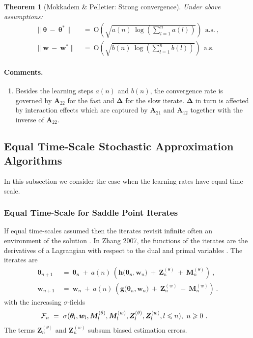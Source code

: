 \documentclass{article}
\newtheorem{theorem}{Theorem}
\newcommand\Bg{\bm{g}}
\newcommand\Bh{\bm{h}}
\newcommand\Bw{\bm{w}}
\newcommand\BA{\bm{A}}
\newcommand\BM{\bm{M}}
\newcommand\BZ{\bm{Z}}
\newcommand\Bth{\bm{\theta}}
\newcommand\BDe{\bm{\Delta}}
\newcommand{\rO}{\mathrm{O}} \newcommand{\rP}{\mathrm{P}}
\renewcommand{\leq}{\leqslant}
\renewcommand{\geq}{\geqslant}
\begin{document}
\begin{theorem}[Mokkadem \& Pelletier: Strong convergence]
\label{th:Mokkadem1}
Under above assumptions:
\begin{align}
\| \Bth \ - \ \Bth^{*} \| \ &= \
\rO \left(
\sqrt{a(n) \ \log \left( \sum_{l=1}^{n} a(l) \right) }
\right) \ \  \text{a.s.}  \ , \\
\| \Bw \ - \ \Bw^{*} \| \ &= \
\rO \left(
\sqrt{b(n) \ \log \left( \sum_{l=1}^{n} b(l) \right) }
\right) \ \  \text{a.s.}
\end{align}
\end{theorem}

\paragraph{Comments.}
\begin{enumerate}[label=\textbf{(C\arabic*)}]
\item
Besides the learning steps $a(n)$ and $b(n)$,
the convergence rate is governed by
$\BA_{22}$ for the fast and $\BDe$
for the slow iterate.
$\BDe$ in turn is affected by interaction effects which are
captured by $\BA_{21}$ and $\BA_{12}$ together with the inverse of
$\BA_{22}$.

\end{enumerate}

\subsection{Equal Time-Scale Stochastic Approximation Algorithms}
\label{sec:equalTime}


In this subsection we consider the case when the learning rates have
equal time-scale.


\subsubsection{Equal Time-Scale for Saddle Point Iterates}

If equal time-scales assumed then the iterates revisit infinite often
an environment of the solution \cite{Zhang:07}.
In Zhang 2007, the functions of the
iterates are the derivatives of a Lagrangian with respect to the dual
and primal variables \cite{Zhang:07}.
The iterates are
\begin{align}
\label{eq:iter1Zhang}
\Bth_{n+1} \ &= \ \Bth_n \ + \ a(n) \ \left(\Bh\big(\Bth_n, \Bw_n\big) \ + \
               \BZ^{(\theta)}_n \ + \ \BM^{(\theta)}_{n}\right) \ ,\\
\label{eq:iter2Zhang}
\Bw_{n+1} \ &= \ \Bw_n  \ + \ a(n)\ \left(\Bg\big(\Bth_n, \Bw_n\big) \ + \
              \BZ^{(w)}_n \ + \ \BM^{(w)}_{n}\right) \ .
\end{align}
with the increasing $\sigma$-fields
\begin{align}
\cF_n \ &= \ \sigma(\Bth_l, \Bw_l, \BM^{(\theta)}_{l}, \BM^{(w)}_{l},
          \BZ^{(\theta)}_{l}, \BZ^{(w)}_{l}, l \leq n), \ n \geq 0 \ .
\end{align}
The terms $\BZ^{(\theta)}_n$ and $\BZ^{(w)}_n$ subsum biased estimation
errors.
\end{document}
